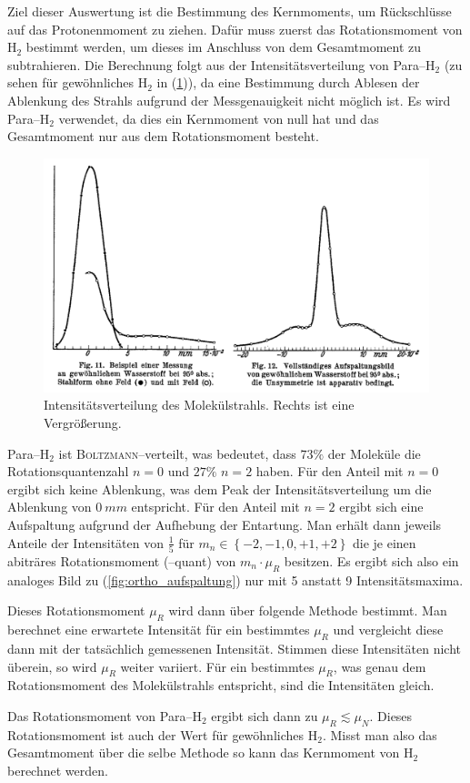 \documentclass[sn-mathphys-num,iicol]{sn-jnl}
\theoremstyle{thmstyleone}
\theoremstyle{thmstyletwo}
\theoremstyle{thmstylethree}
\begin{document}
Ziel dieser Auswertung ist die Bestimmung des Kernmoments, um Rückschlüsse auf das Protonenmoment zu ziehen.
Dafür muss zuerst das Rotationsmoment von $\text{H}_2$ bestimmt werden, um dieses im Anschluss von dem Gesamtmoment zu subtrahieren.
Die Berechnung folgt aus der Intensitätsverteilung von Para--$\text{H}_2$ (zu sehen für gewöhnliches $\text{H}_2$ in (\ref{fig:graph})), da eine Bestimmung durch Ablesen der Ablenkung des Strahls aufgrund der Messgenauigkeit nicht möglich ist.
Es wird Para--$\text{H}_2$ verwendet, da dies ein Kernmoment von null hat und das Gesamtmoment nur aus dem Rotationsmoment besteht.
\begin{figure}[h]
        \centering
        \includegraphics[width=.5\textwidth]{../vortrag/prosi_frisch_stern_auswertung_graph.png}
        \caption{Intensitätsverteilung des Molekülstrahls. Rechts ist eine Vergrößerung.\cite{FrischStern1933}} \label{fig:graph}
\end{figure}
Para--$\text{H}_2$ ist \textsc{Boltzmann}--verteilt, was bedeutet, dass $73\%$ der Moleküle die Rotationsquantenzahl $n=0$ und $27\%$ $n=2$ haben.
Für den Anteil mit $n=0$ ergibt sich keine Ablenkung, was dem Peak der Intensitätsverteilung um die Ablenkung von $\SI{0}{mm}$ entspricht.
Für den Anteil mit $n=2$ ergibt sich eine Aufspaltung aufgrund der Aufhebung der Entartung.
Man erhält dann jeweils Anteile der Intensitäten von $\tfrac{1}{5}$ für $m_n  \in \left\{-2,-1,0,+1,+2\right\}$ die je einen abiträres Rotationsmoment (--quant) von $m_n\cdot \mu _R$ besitzen.
Es ergibt sich also ein analoges Bild zu (\ref{fig:ortho_aufspaltung}) nur mit 5 anstatt 9 Intensitätsmaxima.

Dieses Rotationsmoment $\mu _R$ wird dann über folgende Methode bestimmt.
Man berechnet eine erwartete Intensität für ein bestimmtes $\mu _R$ und vergleicht diese dann mit der tatsächlich gemessenen Intensität.
Stimmen diese Intensitäten nicht überein, so wird $\mu _R$ weiter variiert.
Für ein bestimmtes $\mu _R$, was genau dem Rotationsmoment des Molekülstrahls entspricht, sind die Intensitäten gleich.

Das Rotationsmoment von Para--$\text{H}_2$ ergibt sich dann zu $\mu _R\lesssim \mu _N$.
Dieses Rotationsmoment ist auch der Wert für gewöhnliches $\text{H}_2$.
Misst man also das Gesamtmoment über die selbe Methode so kann das Kernmoment von $\text{H}_2$ berechnet werden.\cite{FrischStern1933}
\end{document}
